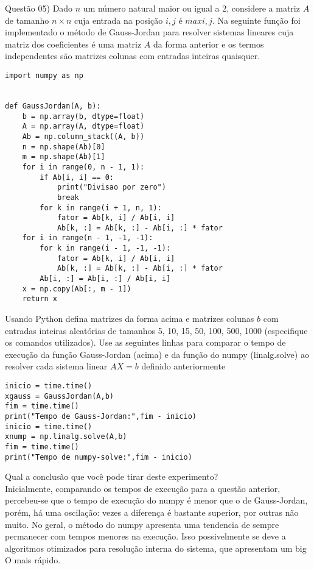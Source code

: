
\noindent \textcolor{COLOR1}{Questão 05)} Dado $n$ um número natural maior ou igual a 2, considere a matriz $A$ de tamanho
$n \times n$ cuja entrada na posição $i, j$ é $max{i, j}$. Na seguinte função foi implementado o método
de Gauss-Jordan para resolver sistemas lineares cuja matriz dos coeficientes é uma matriz $A$ da
forma anterior e os termos independentes são matrizes colunas com entradas inteiras quaisquer.
\\

\begin{lstlisting}
import numpy as np


def GaussJordan(A, b):
    b = np.array(b, dtype=float)
    A = np.array(A, dtype=float)
    Ab = np.column_stack((A, b))
    n = np.shape(Ab)[0]
    m = np.shape(Ab)[1]
    for i in range(0, n - 1, 1):
        if Ab[i, i] == 0:
            print("Divisao por zero")
            break
        for k in range(i + 1, n, 1):
            fator = Ab[k, i] / Ab[i, i]
            Ab[k, :] = Ab[k, :] - Ab[i, :] * fator
    for i in range(n - 1, -1, -1):
        for k in range(i - 1, -1, -1):
            fator = Ab[k, i] / Ab[i, i]
            Ab[k, :] = Ab[k, :] - Ab[i, :] * fator
        Ab[i, :] = Ab[i, :] / Ab[i, i]
    x = np.copy(Ab[:, m - 1])
    return x
\end{lstlisting}


Usando Python defina matrizes da forma acima e matrizes colunas $b$ com entradas inteiras aleatórias de tamanhos 5, 10, 15, 50, 100, 500, 1000 (especifique os comandos utilizados). Use as seguintes linhas para comparar o tempo de execução da função Gauss-Jordan (acima) e da função do numpy (linalg.solve) ao resolver cada sistema linear $AX = b$ definido anteriormente
\\

\begin{lstlisting}
inicio = time.time()
xgauss = GaussJordan(A,b)
fim = time.time()
print("Tempo de Gauss-Jordan:",fim - inicio)
inicio = time.time()
xnump = np.linalg.solve(A,b)
fim = time.time()
print("Tempo de numpy-solve:",fim - inicio)    
\end{lstlisting}

Qual a conclusão que você pode tirar deste experimento?
\\

Inicialmente, comparando os tempos de execução para a questão anterior, percebeu-se que o tempo de execução do numpy é menor que o de Gauss-Jordan, porém, há uma oscilação: vezes a diferença é bastante superior, por outras não muito. No geral, o método do numpy apresenta uma tendencia de sempre permanecer com tempos menores na execução. Isso possivelmente se deve a algoritmos otimizados para resolução interna do sistema, que apresentam um big O mais rápido.
\\

